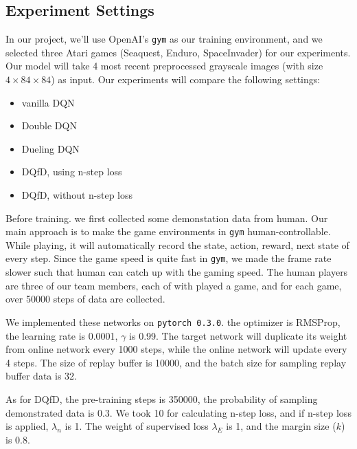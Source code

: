 \documentclass[a0,portrait]{a0poster}
\begin{document}
\begin{multicols}{2}

\color{DarkSlateGray} %

\section*{Experiment Settings}

In our project, we'll use OpenAI's \texttt{gym} as our training environment, and we selected three Atari games (Seaquest, Enduro, SpaceInvader) for our experiments. Our model will take 4 most recent preprocessed grayscale images (with size $4\times 84 \times 84$) as input. Our experiments will compare the following settings:
\begin{itemize}
    \item vanilla DQN
    \item Double DQN
    \item Dueling DQN
    \item DQfD, using n-step loss
    \item DQfD, without n-step loss
\end{itemize}

Before training. we first collected some demonstation data from human. Our main approach is to make the game environments in \texttt{gym} human-controllable. While playing, it will automatically record the state, action, reward, next state of every step. Since the game speed is quite fast in \texttt{gym}, we made the frame rate slower such that human can catch up with the gaming speed. The human players are three of our team members, each of with played a game, and for each game, over 50000 steps of data are collected.


We implemented these networks on \texttt{pytorch 0.3.0}. the optimizer is RMSProp, the learning rate is 0.0001, $\gamma$ is 0.99. The target network will duplicate its weight from online network every 1000 steps, while the online network will update every 4 steps. The size of replay buffer is 10000, and the batch size for sampling replay buffer data is 32.\par

As for DQfD, the pre-training steps is 350000, the probability of sampling demonstrated data is 0.3. We took 10 for calculating n-step loss, and if n-step loss is applied, $\lambda_n$ is 1. The weight of supervised loss $\lambda_E$ is 1, and the margin size ($k$) is 0.8.


\end{multicols}
\end{document}
